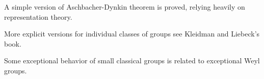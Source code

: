 \documentclass[a4paper & 11pt]{article}
\begin{document}
A simple version of Aschbacher-Dynkin theorem is proved, relying heavily on representation theory.

More explicit versions for individual classes of groups see Kleidman and Liebeck's book.

Some exceptional behavior of small classical groups is related to exceptional Weyl groups.


\ifx\ChapThreeSecOne\undefined %
     
\end{document}
